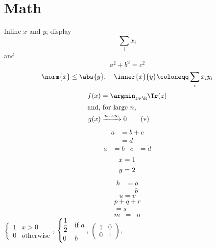 \section{Math}\label{sec:math}
Inline $x$ and \(y\); display \[ \sum_i x_i \] and
$$ a^2 + b^2 = c^2 $$
\begin{equation}\label{eq:one}
  \norm{x} \le \abs{y}, \quad \inner{x}{y} \coloneqq \sum_i x_i y_i
\end{equation}
\begin{align}
  f(x) &= \argmin_{z \in \R} \Tr(z) \nonumber \\
  \intertext{and, for large $n$,}%
  g(x) &\xrightarrow{n \to \infty} 0 \tag{$*$}
\end{align}
\begin{equation}\begin{aligned} a &= b + c \\ &= d \end{aligned}\end{equation}%
\begin{align*} a &= b & c &= d \end{align*}
\begin{gather} x = 1 \notag \\ y = 2 \end{gather}
\begin{equation}\begin{split} h &= a \\ &= b \end{split}\end{equation}
\begin{subequations}\begin{equation} u = v \end{equation}\end{subequations}
\begin{multline} p + q + r \\ = s \end{multline}
\begin{eqnarray} m &=& n \end{eqnarray}
$\begin{cases} 1 & x > 0 \\ 0 & \text{otherwise} \end{cases}$,
$\begin{dcases} \frac{1}{2} & \mbox{if } a \\ 0 & b \end{dcases}$,
$\begin{pmatrix} 1 & 0 \\ 0 & 1 \end{pmatrix}$,
